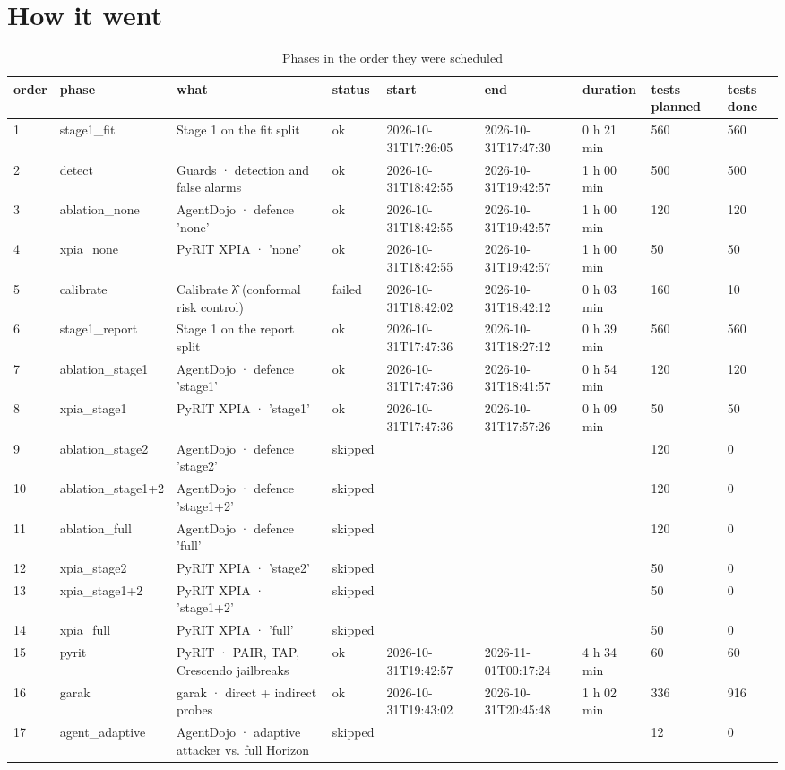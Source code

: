 \documentclass[11pt,a4paper]{article}
\begin{document}
\section*{How it went}
\begin{small}\begin{longtable}{lllllllll}
\caption{Phases in the order they were scheduled}\\
\toprule
order & phase & what & status & start & end & duration & tests planned & tests done \\
\midrule\endhead
1 & stage1\_fit & Stage 1 on the fit split & ok & 2026-10-31T17:26:05 & 2026-10-31T17:47:30 & 0 h 21 min & 560 & 560 \\
2 & detect & Guards · detection and false alarms & ok & 2026-10-31T18:42:55 & 2026-10-31T19:42:57 & 1 h 00 min & 500 & 500 \\
3 & ablation\_none & AgentDojo · defence 'none' & ok & 2026-10-31T18:42:55 & 2026-10-31T19:42:57 & 1 h 00 min & 120 & 120 \\
4 & xpia\_none & PyRIT XPIA · 'none' & ok & 2026-10-31T18:42:55 & 2026-10-31T19:42:57 & 1 h 00 min & 50 & 50 \\
5 & calibrate & Calibrate λ̂ (conformal risk control) & failed & 2026-10-31T18:42:02 & 2026-10-31T18:42:12 & 0 h 03 min & 160 & 10 \\
6 & stage1\_report & Stage 1 on the report split & ok & 2026-10-31T17:47:36 & 2026-10-31T18:27:12 & 0 h 39 min & 560 & 560 \\
7 & ablation\_stage1 & AgentDojo · defence 'stage1' & ok & 2026-10-31T17:47:36 & 2026-10-31T18:41:57 & 0 h 54 min & 120 & 120 \\
8 & xpia\_stage1 & PyRIT XPIA · 'stage1' & ok & 2026-10-31T17:47:36 & 2026-10-31T17:57:26 & 0 h 09 min & 50 & 50 \\
9 & ablation\_stage2 & AgentDojo · defence 'stage2' & skipped &  &  &  & 120 & 0 \\
10 & ablation\_stage1+2 & AgentDojo · defence 'stage1+2' & skipped &  &  &  & 120 & 0 \\
11 & ablation\_full & AgentDojo · defence 'full' & skipped &  &  &  & 120 & 0 \\
12 & xpia\_stage2 & PyRIT XPIA · 'stage2' & skipped &  &  &  & 50 & 0 \\
13 & xpia\_stage1+2 & PyRIT XPIA · 'stage1+2' & skipped &  &  &  & 50 & 0 \\
14 & xpia\_full & PyRIT XPIA · 'full' & skipped &  &  &  & 50 & 0 \\
15 & pyrit & PyRIT · PAIR, TAP, Crescendo jailbreaks & ok & 2026-10-31T19:42:57 & 2026-11-01T00:17:24 & 4 h 34 min & 60 & 60 \\
16 & garak & garak · direct + indirect probes & ok & 2026-10-31T19:43:02 & 2026-10-31T20:45:48 & 1 h 02 min & 336 & 916 \\
17 & agent\_adaptive & AgentDojo · adaptive attacker vs. full Horizon & skipped &  &  &  & 12 & 0 \\
\bottomrule
\end{longtable}\end{small}
\end{document}
